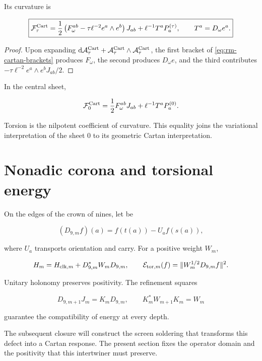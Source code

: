 Its curvature is

\begin{equation}
\boxed{
\mathcal F_\tau^{\rm Cart}
=\frac12\left(F_\omega^{ab}-\tau\ell^{-2}e^a\wedge e^b\right)J_{ab}
+\ell^{-1}T^aP_a^{(\tau)},
\qquad T^a=D_\omega e^a.}
\label{eq:rm-trit-cartan-curvature}
\end{equation}

\begin{proof}
Upon expanding
\(\mathrm d\mathcal A_\tau^{\rm Cart}
+\mathcal A_\tau^{\rm Cart}\wedge\mathcal A_\tau^{\rm Cart}\), the first
bracket of \cref{eq:rm-cartan-brackets} produces \(F_\omega\), the second
produces \(D_\omega e\), and the third contributes
\(-\tau\ell^{-2}e^a\wedge e^bJ_{ab}/2\).
\end{proof}

In the central sheet,

\[
\mathcal F_0^{\rm Cart}
=\frac12F_\omega^{ab}J_{ab}+\ell^{-1}T^aP_a^{(0)}.
\]

Torsion is the nilpotent coefficient of curvature. This equality
joins the variational interpretation of the sheet
\(0\) to its geometric Cartan
interpretation.

\section{Nonadic corona and torsional energy}

On the edges of the crown of nines, let be

\[
(D_{9,m}f)(a)=f(t(a))-U_a f(s(a)),
\]

where \(U_a\) transports orientation and carry. For a
positive weight \(W_m\),

\begin{equation}
H_m=H_{{\rm clk},m}+D_{9,m}^*W_mD_{9,m},
\qquad
\mathcal E_{{\rm tor},m}(f)
=\|W_m^{1/2}D_{9,m}f\|^2.
\label{eq:rm-nonadic-torsion-energy}
\end{equation}

Unitary holonomy preserves positivity. The refinement squares

\[
D_{9,m+1}J_m=K_mD_{9,m},
\qquad
K_m^*W_{m+1}K_m=W_m
\]

guarantee the compatibility of energy at every depth.

The subsequent closure will construct the screen soldering that transforms this
defect into a Cartan response. The present section fixes the operator
domain and the positivity that this intertwiner must preserve.

